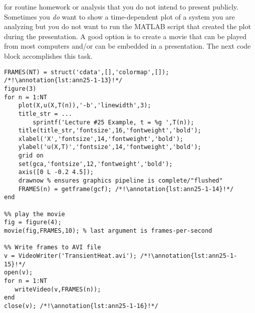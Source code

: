  for routine homework or analysis that you do not intend to present publicly. Sometimes you \emph{do} want to show a time-dependent plot of a system you are analyzing but you do not want to run the MATLAB script that created the plot during the presentation.  A good option is to create a movie that can be played from most computers and/or can be embedded in a presentation.  The next code block accomplishes this task.
\begin{lstlisting}[style=myMatlab, name=lec25-ex1]
%% Save the time-dependent plot as a Movie 
FRAMES(NT) = struct('cdata',[],'colormap',[]); /*!\annotation{lst:ann25-1-13}!*/
figure(3)
for n = 1:NT
    plot(X,u(X,T(n)),'-b','linewidth',3);
    title_str = ...
        sprintf('Lecture #25 Example, t = %g ',T(n));
    title(title_str,'fontsize',16,'fontweight','bold');
    xlabel('X','fontsize',14,'fontweight','bold');
    ylabel('u(X,T)','fontsize',14,'fontweight','bold');
    grid on
    set(gca,'fontsize',12,'fontweight','bold');
    axis([0 L -0.2 4.5]);
    drawnow % ensures graphics pipeline is complete/"flushed"
    FRAMES(n) = getframe(gcf); /*!\annotation{lst:ann25-1-14}!*/
end

%% play the movie
fig = figure(4);
movie(fig,FRAMES,10); % last argument is frames-per-second

%% Write frames to AVI file 
v = VideoWriter('TransientHeat.avi'); /*!\annotation{lst:ann25-1-15}!*/
open(v);
for n = 1:NT
   writeVideo(v,FRAMES(n)); 
end
close(v); /*!\annotation{lst:ann25-1-16}!*/
\end{lstlisting}


